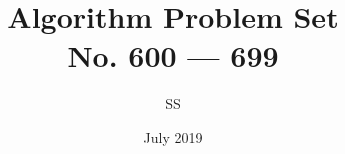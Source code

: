 \documentclass[a4paper,12pt]{article}
\title{Algorithm Problem Set \\ \large No. 600 --- 699}
\author{SS}
\date{July 2019}
\begin{document}
\renewcommand{\thelstlisting}{\thesection.\arabic{lstlisting}}
\newcommand{\fcc}[1]{\lstinline[language=C++, basicstyle=\small\ttfamily, keywordstyle=\bfseries\color{green!40!black}]|#1|}
\newcommand{\fcj}[1]{\lstinline[language=Java, basicstyle=\small\ttfamily, keywordstyle=\bfseries\color{green!40!black}]|#1|}
\maketitle
% 
% 
% 
% 
% 
% 
% 
% 
% 
% 
% 

%
%
%
%
% 
% 
%
%
%
% 
% 
% 
% 
% 
%
%
% 
% 
% 
% 
% 
% 
% 
% 
% 
% 
% 
% 
% 
% 
% 
% 
% 
% 

% 
% 
% 
% 
% 
% 
% 
% 
% 
% 
% 
% 

% 
% 
% 
% 
% 
% 
% 
% 
% 
% 
% 
% 
% 

% 
% 
% 
% 
% 
% 
% 



















\end{document}
